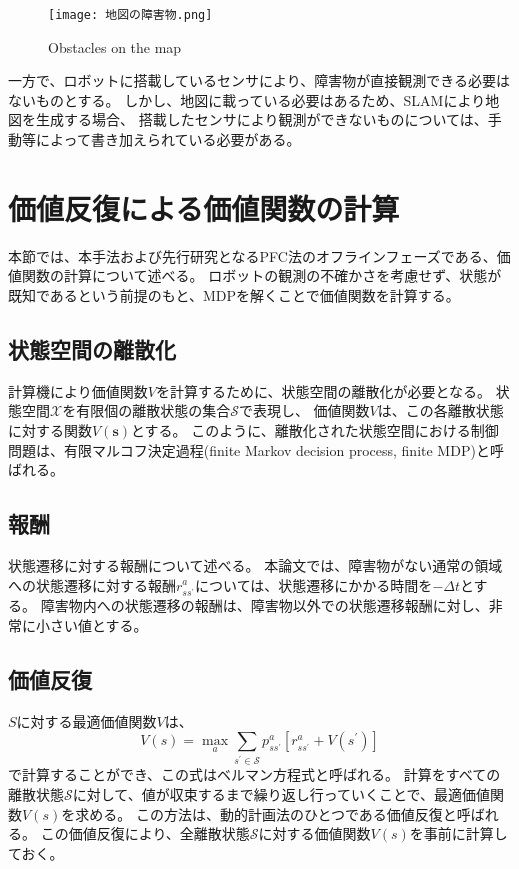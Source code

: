 \begin{figure}[h]
  \begin{center}
    \texttt{[image: 地図の障害物.png]}
    \caption{Obstacles on the map}
    \label{fig:地図の障害物}
  \end{center}
\end{figure}

一方で、ロボットに搭載しているセンサにより、障害物が直接観測できる必要はないものとする。
しかし、地図に載っている必要はあるため、SLAMにより地図を生成する場合、
搭載したセンサにより観測ができないものについては、手動等によって書き加えられている必要がある。


\section{価値反復による価値関数の計算} \label{section:価値関数}
本節では、本手法および先行研究となるPFC法のオフラインフェーズである、価値関数の計算について述べる。
ロボットの観測の不確かさを考慮せず、状態が既知であるという前提のもと、MDPを解くことで価値関数を計算する。

\subsection{状態空間の離散化}
計算機により価値関数$V$を計算するために、状態空間の離散化が必要となる。
状態空間$\mathcal{X}$を有限個の離散状態の集合$\mathcal{S}$で表現し、
価値関数$V$は、この各離散状態に対する関数$V(\bm{s})$とする。
このように、離散化された状態空間における制御問題は、有限マルコフ決定過程(finite Markov decision process, finite MDP)と呼ばれる。

\subsection{報酬} \label{subsection:報酬}
状態遷移に対する報酬について述べる。
本論文では、障害物がない通常の領域への状態遷移に対する報酬$r^{a}_{ss^{\prime}}$については、状態遷移にかかる時間を$-\Delta t$とする。
障害物内への状態遷移の報酬は、障害物以外での状態遷移報酬に対し、非常に小さい値とする。

\subsection{価値反復}
$S$に対する最適価値関数$V$は、
\begin{equation}
\label{bellman equation}
  V(s) = \max_{a} \sum_{s^{\prime} \in \mathcal{S}}
         p^{a}_{ss^{\prime}} \left[ r^{a}_{ss^{\prime}} + V(s^{\prime}) \right]
\end{equation}
で計算することができ、この式はベルマン方程式と呼ばれる。
計算をすべての離散状態$\mathcal{S}$に対して、値が収束するまで繰り返し行っていくことで、最適価値関数$V(s)$を求める。
この方法は、動的計画法のひとつである価値反復と呼ばれる。
この価値反復により、全離散状態$\mathcal{S}$に対する価値関数$V(s)$を事前に計算しておく。


